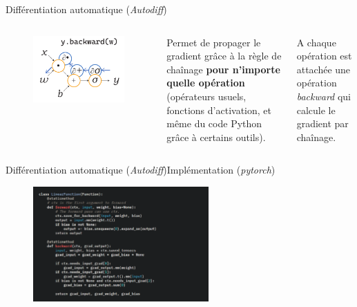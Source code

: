\documentclass[12pt,dvipsnames,aspectratio=169]{beamer}
\begin{document}
\begin{frame}{Différentiation automatique (\textit{Autodiff})}


\begin{columns}

    
\begin{figure}
    \centering
    \includegraphics[width=\textwidth]{figures/autodiff.pdf}
\end{figure}


Permet de propager le gradient grâce à la règle de chaînage \textbf{pour n'importe quelle opération} (opérateurs usuels, fonctions d'activation, et même du code Python grâce à certains outils).\par

A chaque opération est attachée une opération \textit{backward} qui calcule le gradient par chaînage.

\end{columns}

    
\end{frame}
    
\begin{frame}{Différentiation automatique (\textit{Autodiff})}{Implémentation (\textit{pytorch})}

\begin{figure}
    \centering
    \includegraphics[width=0.6\textwidth]{figures/torchfunction.png}
\end{figure}
    
\end{frame}
\end{document}
